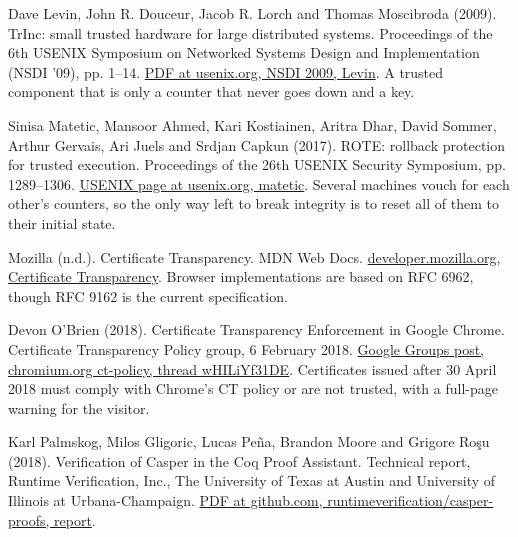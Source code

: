 \documentclass[11pt,twoside]{article}
\theoremstyle{thielethm}
\theoremstyle{thieledef}
\theoremstyle{thieledef}
\theoremstyle{thieledef}
\theoremstyle{thielethm}
\theoremstyle{thieleobs}
\theoremstyle{thielethm}
\begin{document}
\noindent Dave Levin, John R. Douceur, Jacob R. Lorch and Thomas Moscibroda (2009). TrInc: small trusted hardware for large distributed systems. Proceedings of the 6th USENIX Symposium on Networked Systems Design and Implementation (NSDI '09), pp. 1--14. \href{https://www.usenix.org/legacy/event/nsdi09/tech/full_papers/levin/levin.pdf}{PDF at usenix.org, NSDI 2009, Levin}. A trusted component that is only a counter that never goes down and a key.
\par\medskip

\noindent Sinisa Matetic, Mansoor Ahmed, Kari Kostiainen, Aritra Dhar, David Sommer, Arthur Gervais, Ari Juels and Srdjan Capkun (2017). ROTE: rollback protection for trusted execution. Proceedings of the 26th USENIX Security Symposium, pp. 1289--1306. \href{https://www.usenix.org/conference/usenixsecurity17/technical-sessions/presentation/matetic}{USENIX page at usenix.org, matetic}. Several machines vouch for each other's counters, so the only way left to break integrity is to reset all of them to their initial state.
\par\medskip

\noindent Mozilla (n.d.). Certificate Transparency. MDN Web Docs. \href{https://developer.mozilla.org/en-US/docs/Web/Security/Defenses/Certificate_Transparency}{developer.mozilla.org, Certificate Transparency}. Browser implementations are based on RFC 6962, though RFC 9162 is the current specification.
\par\medskip

\noindent Devon O'Brien (2018). Certificate Transparency Enforcement in Google Chrome. Certificate Transparency Policy group, 6 February 2018. \href{https://groups.google.com/a/chromium.org/g/ct-policy/c/wHILiYf31DE/m/iMFmpMEkAQAJ}{Google Groups post, chromium.org ct-policy, thread wHILiYf31DE}. Certificates issued after 30 April 2018 must comply with Chrome's CT policy or are not trusted, with a full-page warning for the visitor.
\par\medskip

\noindent Karl Palmskog, Milos Gligoric, Lucas Pe\~na, Brandon Moore and Grigore Ro\c{s}u (2018). Verification of Casper in the Coq Proof Assistant. Technical report, Runtime Verification, Inc., The University of Texas at Austin and University of Illinois at Urbana-Champaign. \href{https://github.com/runtimeverification/casper-proofs/blob/master/report/report.pdf}{PDF at github.com, runtimeverification/casper-proofs, report}.
\par\medskip
\end{document}
